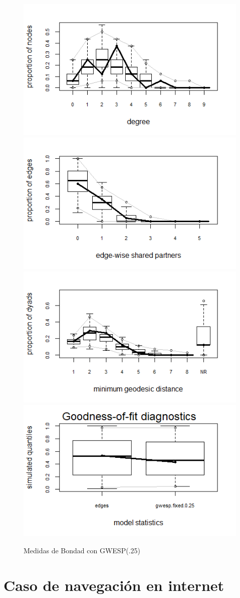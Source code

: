 \begin{figure}[h]
\includegraphics[width=.5\textwidth]{Tesis/Figures/gwespgof1.jpg}
\includegraphics[width=.5\textwidth]{Tesis/Figures/gwespgof2.jpg}
\includegraphics[width=.5\textwidth]{Tesis/Figures/gwespgof3.jpg}
\includegraphics[width=.5\textwidth]{Tesis/Figures/gwespgof4.jpg}
\caption{Medidas de Bondad con GWESP(.25)}
\centering
\end{figure}



\section{Caso de navegación en internet}

